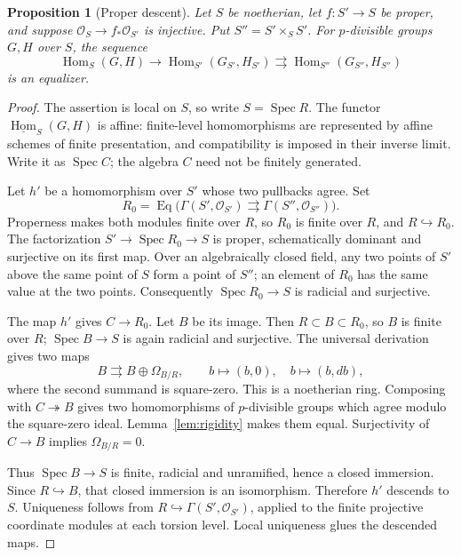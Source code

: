 \documentclass[11pt]{article}
\newtheorem{proposition}[theorem]{Proposition}
\theoremstyle{definition}\newtheorem{definition}[theorem]{Definition}
\theoremstyle{remark}\newtheorem{remark}[theorem]{Remark}
\newcommand{\Spec}{\operatorname{Spec}}
\newcommand{\OO}{\mathcal O}
\newcommand{\Hom}{\operatorname{Hom}}
\begin{document}
\begin{proposition}[Proper descent]\label{prop:proper}
Let $S$ be noetherian, let $f:S'\to S$ be proper, and suppose $\OO_S\to f_*\OO_{S'}$ is injective. Put $S''=S'\times_S S'$. For $p$-divisible groups $G,H$ over $S$, the sequence
\[
 \Hom_S(G,H)\longrightarrow\Hom_{S'}(G_{S'},H_{S'})
 \rightrightarrows\Hom_{S''}(G_{S''},H_{S''})
\]
is an equalizer.
\end{proposition}
\begin{proof}
The assertion is local on $S$, so write $S=\Spec R$. The functor $\underline{\Hom}_S(G,H)$ is affine: finite-level homomorphisms are represented by affine schemes of finite presentation, and compatibility is imposed in their inverse limit. Write it as $\Spec C$; the algebra $C$ need not be finitely generated.

Let $h'$ be a homomorphism over $S'$ whose two pullbacks agree. Set
\[
 R_0=\operatorname{Eq}\bigl(\Gamma(S',\OO_{S'})
       \rightrightarrows\Gamma(S'',\OO_{S''})\bigr).
\]
Properness makes both modules finite over $R$, so $R_0$ is finite over $R$, and $R\hookrightarrow R_0$. The factorization $S'\to\Spec R_0\to S$ is proper, schematically dominant and surjective on its first map. Over an algebraically closed field, any two points of $S'$ above the same point of $S$ form a point of $S''$; an element of $R_0$ has the same value at the two points. Consequently $\Spec R_0\to S$ is radicial and surjective.

The map $h'$ gives $C\to R_0$. Let $B$ be its image. Then $R\subset B\subset R_0$, so $B$ is finite over $R$; $\Spec B\to S$ is again radicial and surjective. The universal derivation gives two maps
\[
 B\rightrightarrows B\oplus\Omega_{B/R},\qquad
 b\longmapsto(b,0),\quad b\longmapsto(b,db),
\]
where the second summand is square-zero. This is a noetherian ring. Composing with $C\twoheadrightarrow B$ gives two homomorphisms of $p$-divisible groups which agree modulo the square-zero ideal. Lemma~\ref{lem:rigidity} makes them equal. Surjectivity of $C\to B$ implies $\Omega_{B/R}=0$.

Thus $\Spec B\to S$ is finite, radicial and unramified, hence a closed immersion. Since $R\hookrightarrow B$, that closed immersion is an isomorphism. Therefore $h'$ descends to $S$. Uniqueness follows from $R\hookrightarrow\Gamma(S',\OO_{S'})$, applied to the finite projective coordinate modules at each torsion level. Local uniqueness glues the descended maps.
\end{proof}
\end{document}
